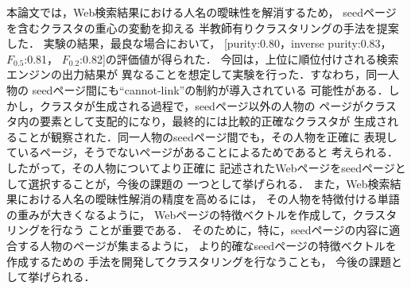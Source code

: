 \documentclass[japanese]{jnlp_1.4}
\begin{document}
本論文では，Web検索結果における人名の曖昧性を解消するため，
seedページを含むクラスタの重心の変動を抑える
半教師有りクラスタリングの手法を提案した．
実験の結果，最良な場合において，
[purity:0.80，inverse purity:0.83，$F_{0.5}$:0.81，
$F_{0.2}$:0.82]の評価値が得られた．
今回は，上位に順位付けされる検索エンジンの出力結果が
異なることを想定して実験を行った．すなわち，同一人物の
seedページ間にも``cannot-link''の制約が導入されている
可能性がある．しかし，クラスタが生成される過程で，seedページ以外の人物の
ページがクラスタ内の要素として支配的になり，最終的には比較的正確なクラスタが
生成されることが観察された．同一人物のseedページ間でも，その人物を正確に
表現しているページ，そうでないページがあることによるためであると
考えられる．したがって，その人物についてより正確に
記述されたWebページをseedページとして選択することが，今後の課題の
一つとして挙げられる．
また，Web検索結果における人名の曖昧性解消の精度を高めるには，
その人物を特徴付ける単語の重みが大きくなるように，
Webページの特徴ベクトルを作成して，クラスタリングを行なう
ことが重要である．
そのために，特に，seedページの内容に適合する人物のページが集まるように，
より的確なseedページの特徴ベクトルを作成するための
手法を開発してクラスタリングを行なうことも，
今後の課題として挙げられる．
\end{document}
